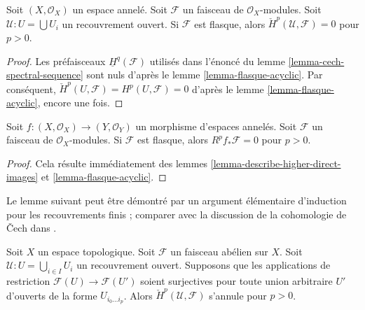 \begin{lemma}

\label{lemma-flasque-acyclic-cech}
Soit $(X, \mathcal{O}_X)$ un espace annelé. Soit $\mathcal{F}$ un faisceau de $\mathcal{O}_X$-modules. Soit $\mathcal{U} : U = \bigcup U_i$ un recouvrement ouvert. Si $\mathcal{F}$ est flasque, alors $\check{H}^p(\mathcal{U}, \mathcal{F}) = 0$ pour $p > 0$.
\end{lemma}

\begin{proof}

Les préfaisceaux $\underline{H}^q(\mathcal{F})$ utilisés dans l'énoncé du lemme \ref{lemma-cech-spectral-sequence} sont nuls d'après le lemme \ref{lemma-flasque-acyclic}. Par conséquent, $\check{H}^p(U, \mathcal{F}) = H^p(U, \mathcal{F}) = 0$
d'après le lemme \ref{lemma-flasque-acyclic}, encore une fois.

\end{proof}

\begin{lemma}

\label{lemma-flasque-acyclic-pushforward}
Soit $f : (X, \mathcal{O}_X) \to (Y, \mathcal{O}_Y)$ un morphisme d'espaces annelés. Soit $\mathcal{F}$ un faisceau de $\mathcal{O}_X$-modules. Si $\mathcal{F}$ est flasque, alors $R^pf_*\mathcal{F} = 0$ pour $p > 0$.
\end{lemma}

\begin{proof}
Cela résulte immédiatement des lemmes \ref{lemma-describe-higher-direct-images} et \ref{lemma-flasque-acyclic}.
\end{proof}

\noindent
Le lemme suivant peut être démontré par un argument élémentaire d'induction pour les recouvrements finis ; comparer avec la discussion de la cohomologie de {\v C}ech dans \cite{FOAG}.

\begin{lemma}

\label{lemma-vanishing-ravi}
Soit $X$ un espace topologique. Soit $\mathcal{F}$ un faisceau abélien sur $X$. Soit $\mathcal{U} : U = \bigcup_{i \in I} U_i$ un recouvrement ouvert. Supposons que les applications de restriction $\mathcal{F}(U) \to \mathcal{F}(U')$ soient surjectives pour toute union arbitraire $U'$ d'ouverts de la forme $U_{i_0 \ldots i_p}$. Alors $\check{H}^p(\mathcal{U}, \mathcal{F})$ s'annule pour $p > 0$.
\end{lemma}

